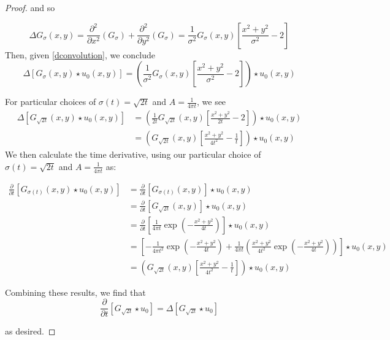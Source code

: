 \begin{proof}
and so

\begin{equation}
\Delta G_\sigma(x,y) =
	\frac{\partial^2}{\partial x^2} \left(G_{\sigma}\right)
	+ \frac{\partial^2}{\partial y^2} \left(G_{\sigma}\right)
	= \frac{1}{\sigma^2} G_\sigma(x,y) \left[ \frac{x^2 + y^2}{\sigma^2} - 2\right] 
\end{equation}
Then, given \cref{dconvolution}, we conclude
\begin{equation}
\Delta \left[ G_\sigma(x,y) \star u_0(x,y) \right] 
= \left(\frac{1}{\sigma^2} G_\sigma(x,y) \left[ \frac{x^2 + y^2}{\sigma^2} - 2\right]\right) \star u_0(x,y)
\end{equation}

For particular choices of $\sigma(t) = \sqrt{2t}$ and $A = \frac{1}{4\pi t}$,
we see 
\begin{align}
	\Delta \left[ G_{\sqrt{2t}}(x,y) \star u_0(x,y) \right] 
	&= \left(\frac{1}{2t} G_{\sqrt{2t}}(x,y) \left[ \frac{x^2 + y^2}{2t} - 2\right]\right) \star u_0(x,y) \\
	&= \left(G_{\sqrt{2t}}(x,y) \left[ \frac{x^2 + y^2}{4t^2} - \frac{1}{t}\right]\right) \star u_0(x,y)
\end{align}
We then calculate the time derivative,
using our particular choice of $\sigma(t) = \sqrt{2t}$ and $A = \frac{1}{4\pi t}$ as:

\begin{align}
\frac{\partial}{\partial t} \left[ G_{\sigma(t)}(x,y) \star u_0(x,y) \right]
&= \frac{\partial}{\partial t} \left[ G_{\sigma(t)}(x,y) \right] \star u_0(x,y) \\
&= \frac{\partial}{\partial t} \left[ G_{\sqrt{2t}}(x,y)\right] \star u_0(x,y) \\
&= \frac{\partial}{\partial t} \left[
\frac{1}{4\pi t} \exp\left(-\frac{x^2 + y^2}{4t}\right) \right] \star u_0(x,y) \\
&= \left[ -\frac{1}{4\pi t^2} \exp\left(-\frac{x^2 + y^2}{4t}\right) + 
\frac{1}{4\pi t}\left( \frac{x^2 + y^2}{4t^2} \exp\left(-\frac{x^2 + y^2}{4t}\right)\right)
	\right] \star u_0(x,y) \\
	&= \left(G_{\sqrt{2t}}(x,y) \left[ \frac{x^2 + y^2}{4t^2} -\frac{1}{t}\right]\right) \star u_0(x,y)
\end{align}

Combining these results, we find that
\begin{equation}
\frac{\partial}{\partial t} \left[ G_{\sqrt{2t}} \star u_0 \right]
= \Delta \left[ G_{\sqrt{2t}} \star u_0 \right] 
\end{equation}

as desired. \end{proof}
\hrulefill
